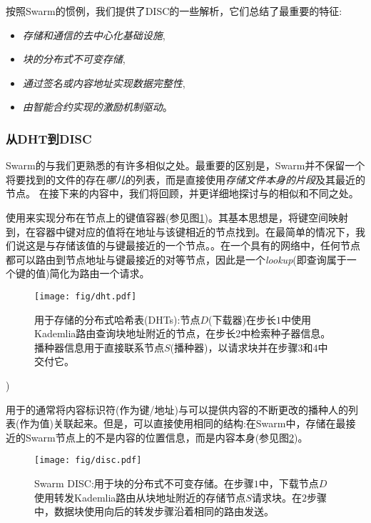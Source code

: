 按照Swarm的惯例，我们提供了DISC的一些解析，它们总结了最重要的特征:


\begin{itemize}
\item \emph{存储和通信的去中心化基础设施}, 
\item \emph{块的分布式不可变存储}, 
\item \emph{通过签名或内容地址实现数据完整性},
\item \emph{由智能合约实现的激励机制驱动}。 

\end{itemize}
 
\subsubsection{从DHT到DISC}
Swarm的与我们更熟悉的有许多相似之处。最重要的区别是，Swarm并不保留一个将要找到的文件的存在\emph{哪儿}的列表，而是直接使用\emph{存储文件本身的片段}及其最近的节点。
在接下来的内容中，我们将回顾，并更详细地探讨与的相似和不同之处。 
 
使用来实现分布在节点上的键值容器(参见图\ref{fig:DHT})。其基本思想是，将键空间映射到，在容器中键对应的值将在地址与该键相近的节点找到。在最简单的情况下，我们说这是与存储该值的与键最接近的一个节点。。在一个具有的网络中，任何节点都可以路由到节点地址与键最接近的对等节点，因此是一个\emph{lookup}(即查询属于一个键的值)简化为路由一个请求。
\begin{figure}[htbp]
   \centering
   \texttt{[image: fig/dht.pdf]}
   \caption[分布式哈希表(dht) \statusgreen]{用于存储的分布式哈希表(DHTs):节点$D$(下载器)在步长$1$中使用Kademlia路由查询块地址附近的节点，在步长$2$中检索种子器信息。播种器信息用于直接联系节点$S$(播种器)，以请求块并在步骤$3$和$4$中交付它。}
   \label{fig:DHT}
\end{figure})

用于的通常将内容标识符(作为键/地址)与可以提供内容\cite{ipfs2014, crosby2007analysis}的不断更改的播种人的列表(作为值)关联起来。但是，可以直接使用相同的结构:在Swarm中，存储在最接近的Swarm节点上的不是内容的位置信息，而是内容本身(参见图\ref{fig:disc})。 


\begin{figure}[htbp]
   \centering
   \texttt{[image: fig/disc.pdf]}
   \caption[Swarm DISC:分布式不可变存储块\statusgreen]{Swarm DISC:用于块的分布式不可变存储。在步骤$1$中，下载节点$D$使用转发Kademlia路由从块地址附近的存储节点$S$请求块。在$2$步骤中，数据块使用向后的转发步骤沿着相同的路由发送。   }
   \label{fig:disc}
\end{figure}

